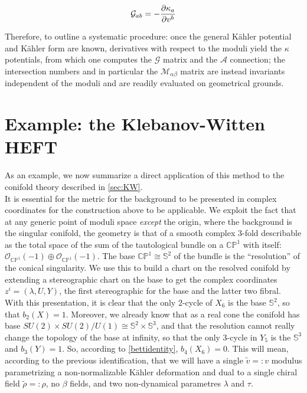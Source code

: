 \begin{equation}
	\mathcal{G}_{ab} = - \frac{\partial\kappa_a}{\partial v^b}
	\label{Gshortcut}
\end{equation}

Therefore, to outline a systematic procedure: once the general K\"ahler potential and K\"ahler form are known, derivatives with respect to the moduli yield the $\kappa$ potentials, from which one computes the $\mathcal{G}$ matrix and the $\mathcal{A}$ connection; the intersection numbers and in particular the $\mathcal{M}_{\alpha\beta}$ matrix are instead invariants independent of the moduli and are readily evaluated on geometrical grounds.

\section{Example: the Klebanov-Witten HEFT}

As an example, we now summarize a direct application of this method to the conifold theory described in \ref{sec:KW}.\\

It is essential for the metric for the background to be presented in complex coordinates for the construction above to be applicable. We exploit the fact that at any generic point of moduli space \emph{except} the origin, where the background is the singular conifold, the geometry is that of a smooth complex 3-fold describable as the total space of the sum of the tautological bundle on a $\mathbb{CP}^1$ with itself: $\mathcal{O}_{\mathbb{CP}^1}(-1) \oplus \mathcal{O}_{\mathbb{CP}^1}(-1)$. The base $\mathbb{CP}^1 \cong \mathbb{S}^2$ of the bundle is the ``resolution'' of the conical singularity. We use this to build a chart on the resolved conifold by extending a stereographic chart on the base to get the complex coordinates $z^i = (\lambda, U, Y)$, the first stereographic for the base and the latter two fibral.\\

With this presentation, it is clear that the only 2-cycle of $X_6$ is the base $\mathbb{S}^2$, so that $b_2(X) = 1$. Moreover, we already know that as a real cone the conifold has base $SU(2)\times SU(2) / U(1) \cong \mathbb{S}^2 \times \mathbb{S}^3$, and that the resolution cannot really change the topology of the base at infinity, so that the only 3-cycle in $Y_5$ is the $\mathbb{S}^3$ and $b_3(Y) = 1$. So, according to \ref{bettidentity}, $b_4(X_6) = 0$. This will mean, according to the previous identification, that we will have a single $\tilde v =: v$ modulus parametrizing a non-normalizable K\"ahler deformation and dual to a single chiral field $\tilde\rho =: \rho$, no $\beta$ fields, and two non-dynamical parametres $\lambda$ and $\tau$. \\


